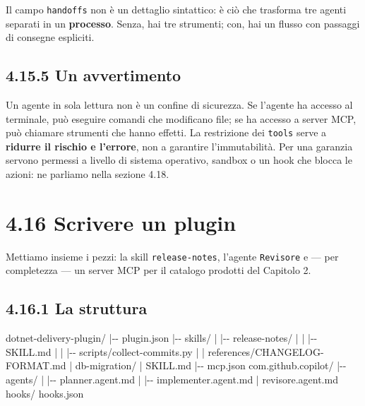 \documentclass[
  italian,
  10pt,
]{book}
\newenvironment{Shaded}{\begin{snugshade}}{\end{snugshade}}
\newcommand{\NormalTok}[1]{#1}
\begin{document}
Il campo \texttt{handoffs} non è un dettaglio sintattico: è ciò che
trasforma tre agenti separati in un \textbf{processo}. Senza, hai tre
strumenti; con, hai un flusso con passaggi di consegne espliciti.

\subsection{4.15.5 Un avvertimento}\label{un-avvertimento}

Un agente in sola lettura non è un confine di sicurezza. Se l'agente ha
accesso al terminale, può eseguire comandi che modificano file; se ha
accesso a server MCP, può chiamare strumenti che hanno effetti. La
restrizione dei \texttt{tools} serve a \textbf{ridurre il rischio e
l'errore}, non a garantire l'immutabilità. Per una garanzia servono
permessi a livello di sistema operativo, sandbox o un hook che blocca le
azioni: ne parliamo nella sezione 4.18.

\section{4.16 Scrivere un plugin}\label{scrivere-un-plugin}

Mettiamo insieme i pezzi: la skill \texttt{release-notes}, l'agente
\texttt{Revisore} e --- per completezza --- un server MCP per il
catalogo prodotti del Capitolo 2.

\subsection{4.16.1 La struttura}\label{la-struttura}

\begin{Shaded}
\begin{Highlighting}[]
\NormalTok{dotnet{-}delivery{-}plugin/}
\NormalTok{|{-}{-} plugin.json}
\NormalTok{|{-}{-} skills/}
\NormalTok{|   |{-}{-} release{-}notes/}
\NormalTok{|   |   |{-}{-} SKILL.md}
\NormalTok{|   |   |{-}{-} scripts/collect{-}commits.py}
\NormalTok{|   |   \textasciigrave{}{-}{-} references/CHANGELOG{-}FORMAT.md}
\NormalTok{|   \textasciigrave{}{-}{-} db{-}migration/}
\NormalTok{|       \textasciigrave{}{-}{-} SKILL.md}
\NormalTok{|{-}{-} mcp.json}
\NormalTok{\textasciigrave{}{-}{-} com.github.copilot/}
\NormalTok{    |{-}{-} agents/}
\NormalTok{    |   |{-}{-} planner.agent.md}
\NormalTok{    |   |{-}{-} implementer.agent.md}
\NormalTok{    |   \textasciigrave{}{-}{-} revisore.agent.md}
\NormalTok{    \textasciigrave{}{-}{-} hooks/}
\NormalTok{        \textasciigrave{}{-}{-} hooks.json}
\end{Highlighting}
\end{Shaded}
\end{document}
